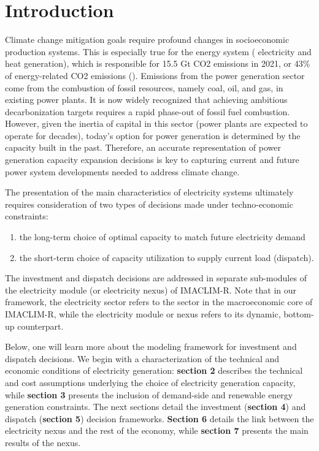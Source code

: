 \section{Introduction}
Climate change mitigation goals require profound changes in socioeconomic production systems. This is especially true for the energy system ( electricity and heat generation), which is responsible for 15.5 Gt CO2 emissions in 2021, or 43\% of energy-related CO2 emissions (\cite{IEA2021}). Emissions from the power generation sector come from the combustion of fossil resources, namely coal, oil, and gas, in existing power plants. It is now widely recognized that achieving ambitious decarbonization targets requires a rapid phase-out of fossil fuel combustion. However, given the inertia of capital in this sector (power plants are expected to operate for decades), today's option for power generation is determined by the capacity built in the past. Therefore, an accurate representation of power generation capacity expansion decisions is key to capturing current and future power system developments needed to address climate change.


The presentation of the main characteristics of electricity systems ultimately requires consideration of two types of decisions made under techno-economic constraints:
\begin{enumerate}
    \item the long-term choice of optimal capacity to match future electricity demand
    \item the short-term choice of capacity utilization to supply current load (dispatch).
\end{enumerate}
The investment and dispatch decisions are addressed in separate sub-modules of the electricity module (or electricity nexus) of IMACLIM-R. Note that in our framework, the electricity sector refers to the sector in the macroeconomic core of IMACLIM-R, while the electricity module or nexus refers to its dynamic, bottom-up counterpart.

Below, one will learn more about the modeling framework for investment and dispatch decisions. We begin with a characterization of the technical and economic conditions of electricity generation: \textbf{section 2} describes the technical and cost assumptions underlying the choice of electricity generation capacity, while \textbf{section 3} presents the inclusion of demand-side and renewable energy generation constraints. The next sections detail the investment (\textbf{section 4}) and dispatch (\textbf{section 5}) decision frameworks. \textbf{Section 6} details the link between the electricity nexus and the rest of the economy, while \textbf{section 7} presents the main results of the nexus.

